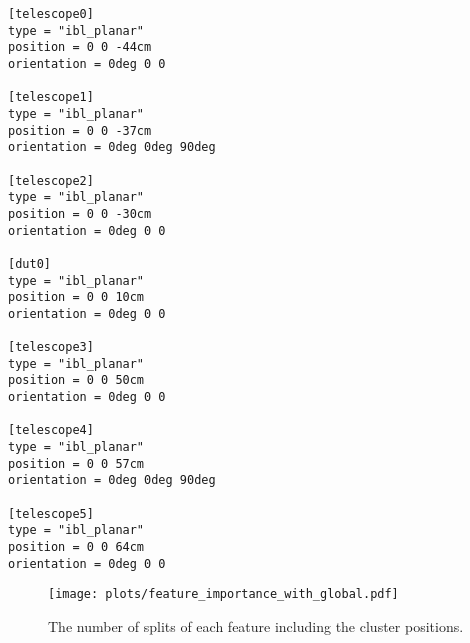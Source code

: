 \clearpage

\begin{lstlisting}[caption={Allpix$^2$ geometry file for all simulations.}]
[telescope0]
type = "ibl_planar"
position = 0 0 -44cm
orientation = 0deg 0 0

[telescope1]
type = "ibl_planar"
position = 0 0 -37cm
orientation = 0deg 0deg 90deg

[telescope2]
type = "ibl_planar"
position = 0 0 -30cm
orientation = 0deg 0 0

[dut0]
type = "ibl_planar"
position = 0 0 10cm
orientation = 0deg 0 0

[telescope3]
type = "ibl_planar"
position = 0 0 50cm
orientation = 0deg 0 0

[telescope4]
type = "ibl_planar"
position = 0 0 57cm
orientation = 0deg 0deg 90deg

[telescope5]
type = "ibl_planar"
position = 0 0 64cm
orientation = 0deg 0 0
\end{lstlisting}

\clearpage

\begin{figure}
  \centering
  \texttt{[image: plots/feature\_importance\_with\_global.pdf]}
  \caption{The number of splits of each feature including the cluster positions.}
  \label{fig:importance_global}
\end{figure}
